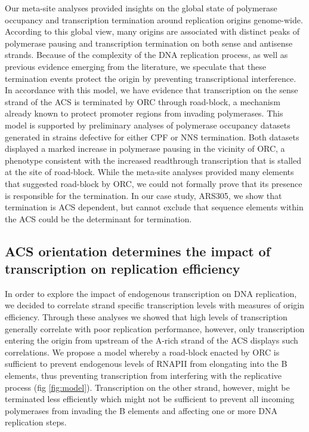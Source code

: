 Our meta-site analyses provided insights on the global state of polymerase occupancy and transcription termination around replication origins genome-wide. According to this global view, many origins are associated with distinct peaks of polymerase pausing and transcription termination on both sense and antisense strands. Because of the complexity of the DNA replication process, as well as previous evidence emerging from the literature, we speculate that these termination events protect the origin by preventing transcriptional interference. In accordance with this model, we have evidence that transcription on the sense strand of the ACS is terminated by ORC through road-block, a mechanism already known to protect promoter regions from invading polymerases. This model is supported by preliminary analyses of polymerase occupancy datasets generated in strains defective for either CPF or NNS termination. Both datasets displayed a marked increase in polymerase pausing in the vicinity of ORC, a phenotype consistent with the increased readthrough transcription that is stalled at the site of road-block. While the meta-site analyses provided many elements that suggested road-block by ORC, we could not formally prove that its presence is responsible for the termination. In our case study, ARS305, we show that termination is ACS dependent, but cannot exclude that sequence elements within the ACS could be the determinant for termination. 

\subsection{ACS orientation determines the impact of transcription on replication efficiency}

In order to explore the impact of endogenous transcription on DNA replication, we decided to correlate strand specific transcription levels with measures of origin efficiency. Through these analyses we showed that high levels of transcription generally correlate with poor replication performance, however, only transcription entering the origin from upstream of the A-rich strand of the ACS displays such correlations. We propose a model whereby a road-block enacted by ORC is sufficient to prevent endogenous levels of RNAPII from elongating into the B elements, thus preventing transcription from interfering with the replicative process (fig \ref{fig:model}). Transcription on the other strand, however, might be terminated less efficiently which might not be sufficient to prevent all incoming polymerases from invading the B elements and affecting one or more DNA replication steps. 


